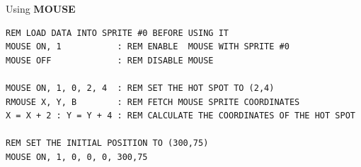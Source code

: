 \begin{description}[leftmargin=2cm,style=nextline]
\item [Examples:] Using {\bf MOUSE}

\begin{tcolorbox}[colback=black,coltext=white]
\verbatimfont{\codefont}
\begin{verbatim}
REM LOAD DATA INTO SPRITE #0 BEFORE USING IT
MOUSE ON, 1           : REM ENABLE  MOUSE WITH SPRITE #0
MOUSE OFF             : REM DISABLE MOUSE

MOUSE ON, 1, 0, 2, 4  : REM SET THE HOT SPOT TO (2,4)
RMOUSE X, Y, B        : REM FETCH MOUSE SPRITE COORDINATES
X = X + 2 : Y = Y + 4 : REM CALCULATE THE COORDINATES OF THE HOT SPOT

REM SET THE INITIAL POSITION TO (300,75)
MOUSE ON, 1, 0, 0, 0, 300,75
\end{verbatim}
\end{tcolorbox}
\end{description}


\newpage
